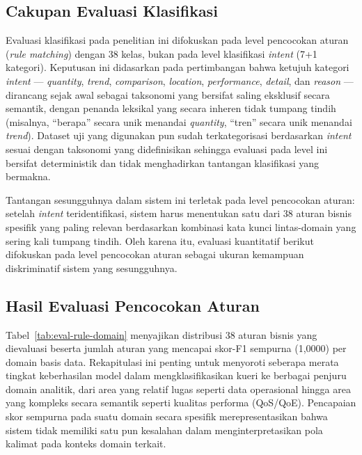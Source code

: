 \subsection{Cakupan Evaluasi Klasifikasi}

Evaluasi klasifikasi pada penelitian ini difokuskan pada level pencocokan aturan (\textit{rule matching}) dengan 38 kelas, bukan pada level klasifikasi \textit{intent} (7+1 kategori). Keputusan ini didasarkan pada pertimbangan bahwa ketujuh kategori \textit{intent} --- \textit{quantity}, \textit{trend}, \textit{comparison}, \textit{location}, \textit{performance}, \textit{detail}, dan \textit{reason} --- dirancang sejak awal sebagai taksonomi yang bersifat saling eksklusif secara semantik, dengan penanda leksikal yang secara inheren tidak tumpang tindih (misalnya, ``berapa'' secara unik menandai \textit{quantity}, ``tren'' secara unik menandai \textit{trend}). Dataset uji yang digunakan pun sudah terkategorisasi berdasarkan \textit{intent} sesuai dengan taksonomi yang didefinisikan sehingga evaluasi pada level ini bersifat deterministik dan tidak menghadirkan tantangan klasifikasi yang bermakna.

Tantangan sesungguhnya dalam sistem ini terletak pada level pencocokan aturan: setelah \textit{intent} teridentifikasi, sistem harus menentukan satu dari 38 aturan bisnis spesifik yang paling relevan berdasarkan kombinasi kata kunci lintas-domain yang sering kali tumpang tindih. Oleh karena itu, evaluasi kuantitatif berikut difokuskan pada level pencocokan aturan sebagai ukuran kemampuan diskriminatif sistem yang sesungguhnya.

\subsection{Hasil Evaluasi Pencocokan Aturan}

Tabel~\ref{tab:eval-rule-domain} menyajikan distribusi 38 aturan bisnis yang dievaluasi beserta jumlah aturan yang mencapai skor-F1 sempurna (1{,}0000) per domain basis data. Rekapitulasi ini penting untuk menyoroti seberapa merata tingkat keberhasilan model dalam mengklasifikasikan kueri ke berbagai penjuru domain analitik, dari area yang relatif lugas seperti data operasional hingga area yang kompleks secara semantik seperti kualitas performa (QoS/QoE). Pencapaian skor sempurna pada suatu domain secara spesifik merepresentasikan bahwa sistem tidak memiliki satu pun kesalahan dalam menginterpretasikan pola kalimat pada konteks domain terkait.

